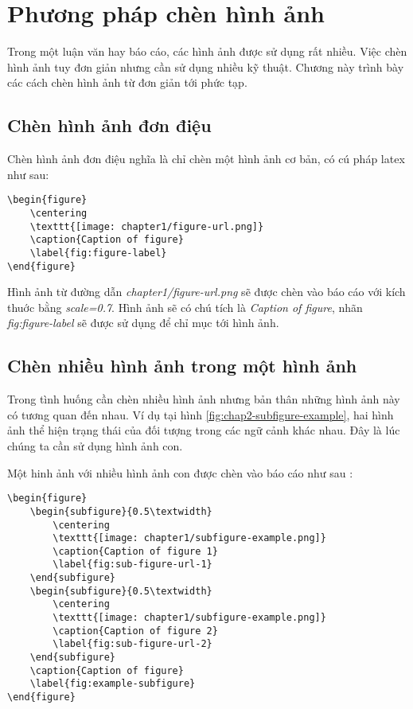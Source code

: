 \chapter{Phương pháp chèn hình ảnh}
\label{chap:chap2-figures}
Trong một luận văn hay báo cáo, các hình ảnh được sử dụng rất nhiều. Việc chèn hình ảnh tuy đơn giản nhưng cần sử dụng nhiều kỹ thuật. Chương này trình bày các cách chèn hình ảnh từ đơn giản tới phức tạp.

\section{Chèn hình ảnh đơn điệu}

Chèn hình ảnh đơn điệu nghĩa là chỉ chèn một hình ảnh cơ bản, có cú pháp latex như sau:

\begin{lstlisting}[language={[LaTeX]TeX}, caption={Chèn một hình ảnh vào báo cáo}, label={lst:figure}]
\begin{figure}
    \centering
    \texttt{[image: chapter1/figure-url.png]}
    \caption{Caption of figure}
    \label{fig:figure-label}
\end{figure}
\end{lstlisting}

Hình ảnh từ đường dẫn \textit{chapter1/figure-url.png} sẽ được chèn vào báo cáo với kích thuớc bằng \textit{scale=0.7}. Hình ảnh sẽ có chú tích là \textit{Caption of figure}, nhãn \textit{fig:figure-label} sẽ được sử dụng để chỉ mục tới hình ảnh.

\section{Chèn nhiều hình ảnh trong một hình ảnh}

Trong tình huống cần chèn nhiều hình ảnh nhưng bản thân những hình ảnh này có tương quan đến nhau. Ví dụ tại hình \ref{fig:chap2-subfigure-example}, hai hình ảnh thể hiện trạng thái của đối tượng trong các ngữ cảnh khác nhau. Đây là lúc chúng ta cần sử dụng hình ảnh con.

Một hinh ảnh với nhiều hình ảnh con được chèn vào báo cáo như sau \cite{ShantoLatex}:

\begin{lstlisting}[language={[LaTeX]TeX}, caption={Chèn nhiều hình ảnh con trong một hình ảnh}, label={lst:example-subfigure}]
\begin{figure}
    \begin{subfigure}{0.5\textwidth}
        \centering
        \texttt{[image: chapter1/subfigure-example.png]}
        \caption{Caption of figure 1}
        \label{fig:sub-figure-url-1}
    \end{subfigure}
    \begin{subfigure}{0.5\textwidth}
        \centering
        \texttt{[image: chapter1/subfigure-example.png]}
        \caption{Caption of figure 2}
        \label{fig:sub-figure-url-2}
    \end{subfigure}
    \caption{Caption of figure}
    \label{fig:example-subfigure}
\end{figure}
      
\end{lstlisting}

